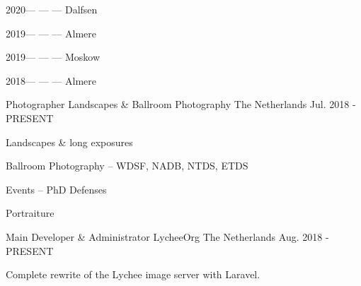 \begin{cventries}
{\begin{cvitems}
			\item {2020\;---\;
			             ---\;
			             ---\;
			            Dalfsen}
			\item {2019\;---\;
			             ---\;
			             ---\;
			            Almere}
			\item {2019\;---\;
			             ---\;
			             ---\;
			            Moskow}
			\item {2018\;---\;
			             ---\;
			             ---\;
			            Almere}
		\end{cvitems}
	}

	\cventry
	{Photographer} %
	{Landscapes \& Ballroom Photography} %
	{The Netherlands} %
	{Jul. 2018 - PRESENT} %
	{
		\begin{cvitems}
			\item Landscapes \& long exposures
			\item Ballroom Photography -- WDSF, NADB, NTDS, ETDS
			\item Events -- PhD Defenses
			\item Portraiture
		\end{cvitems}
	}
	\cventry
	{Main Developer \& Administrator} %
	{LycheeOrg} %
	{The Netherlands} %
	{Aug. 2018 - PRESENT} %
	{
		\begin{cvitems} %
			\item {Complete rewrite of the Lychee image server with Laravel.}
		\end{cvitems}
	}

\end{cventries}
